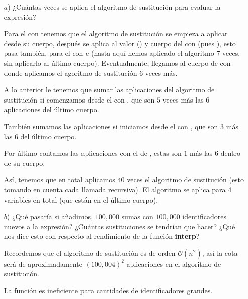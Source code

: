\begin{itemize}
\item[$a$)] ¿Cuántas veces se aplica el algoritmo de sustitución para evaluar
  la expresión?

  Para el  con  tenemos que el algoritmo de sustitución
  se empieza a aplicar desde su cuerpo, después se aplica al valor ()
  y cuerpo del  con  (pues ), esto
  pasa también, para el  con  e  (hasta
  aquí hemos aplicado el algoritmo 7 veces, sin aplicarlo al último cuerpo).
  Eventualmente, llegamos al cuerpo de  con  donde
  aplicamos el agoritmo de sustitución 6 veces más.

  A lo anterior le tenemos que sumar las aplicaciones del algoritmo de sustitución
  si comenzamos desde el  con , que son $5$ veces más
  las $6$ aplicaciones del último cuerpo.

  También sumamos las aplicaciones si iniciamos desde el  con ,
  que son $3$ más las $6$ del último cuerpo.

  Por último contamos las aplicaciones con el  de , estas son
  $1$ más las $6$ dentro de su cuerpo.
  
  Así, tenemos que en total aplicamos $40$ veces el algoritmo de sustitución (esto
  tomando en cuenta cada llamada recursiva). El algoritmo se aplica para $4$ variables
  en total (que están en el último cuerpo).
   
\item[$b$)] ¿Qué pasaría si añadimos, $100,000$ sumas con $100, 000$
  identificadores nuevos a la expresión? ¿Cuántas sustituciones se
  tendrían que hacer? ¿Qué nos dice esto con respecto al rendimiento
  de la función \textbf{interp}?

  Recordemos que el algoritmo de sustitución es de orden $\mathcal{O}(n^2)$,
  así la cota será de aproximadamente $(100,004)^2$ aplicaciones en el algoritmo
  de sustitución.

  La función  es ineficiente para cantidades de identificadores grandes.
\end{itemize}
